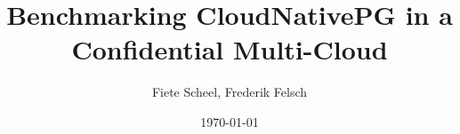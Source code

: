 \documentclass[a4paper, ngerman, 12pt]{scrreprt}
\begin{document}
\title{Benchmarking CloudNativePG in a Confidential Multi-Cloud} %
\author{Fiete Scheel, Frederik Felsch} %
\date{\today} %

\maketitle

\tableofcontents
\newpage

\printbibliography


\end{document}
